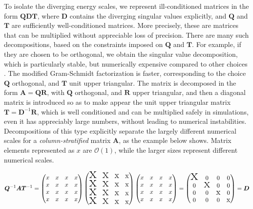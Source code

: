 To isolate the diverging energy scales, we represent ill-conditioned matrices in the form $\bm Q \bm D \bm T$, where $\bm D$ contains the diverging singular values explicitly, and $\bm Q$ and $\bm T$ are sufficiently well-conditioned matrices.
More precisely, these are matrices that can be multiplied without appreciable loss of precision.
There are many such decompositions, based on the constraints imposed on $\bm Q$ and $\bm T$.
For example, if they are chosen to be orthogonal, we obtain the singular value decomposition, which is particularly stable, but numerically expensive compared to other choices \cite{hanke_electronic_nodate}.
The modified Gram-Schmidt factorization is faster, corresponding to the choice $\bm Q$ orthogonal, and $\bm T$ unit upper triangular.
The matrix is decomposed in the form $\bm A = \bm Q \bm R$, with $\bm Q$ orthogonal, and $\bm R$ upper triangular, and then a diagonal matrix is introduced so as to make appear the unit upper triangular matrix $\bm  T = \bm D^{-1} \bm R$, which is well conditioned and can be multiplied safely in simulations, even it has appreciably large numbers, without leading to numerical  instabilities.
Decompositions of this type explicitly separate the largely different numerical scales for a \emph{column-stratified} matrix $\bm A$, as the example below shows.
Matrix elements represented as $x$ are $\mathcal{O}(1)$, while the larger sizes represent different numerical scales.

\begin{equation}
\bm Q^{-1} \bm A \bm T^{-1} =
\begin{pmatrix}
x & x & x & x \\
x & x & x & x \\
x & x & x & x \\ 
x & x & x & x 
\end{pmatrix}
\begin{pmatrix}
$$ \mbox{\Huge x} $$ & $$ \mbox{\huge x} $$ & $$ \mbox{\Large x} $$ & $$ \mbox{\large x} $$\\
$$ \mbox{\Huge x} $$ & $$ \mbox{\huge x} $$ & $$ \mbox{\Large x} $$ & $$ \mbox{\large x} $$ \\
$$ \mbox{\Huge x} $$ & $$ \mbox{\huge x} $$ & $$ \mbox{\Large x} $$ & $$ \mbox{\large x} $$ \\ 
$$ \mbox{\Huge x} $$ & $$ \mbox{\huge x} $$ & $$ \mbox{\Large x} $$ & $$ \mbox{\large x} $$
\end{pmatrix}
\begin{pmatrix}
x & x & x & x \\
x & x & x & x \\
x & x & x & x \\ 
x & x & x & x 
\end{pmatrix} = 
\begin{pmatrix}
$$ \mbox{\Huge x} $$ & 0 & 0 & 0 \\
0 & $$ \mbox{\huge x} $$ & 0 & 0 \\
0 & 0 & $$ \mbox{\Large x} $$ & 0 \\ 
0 & 0 & 0 & $$ \mbox{\large x} $$
\end{pmatrix} = \bm D
\end{equation}


